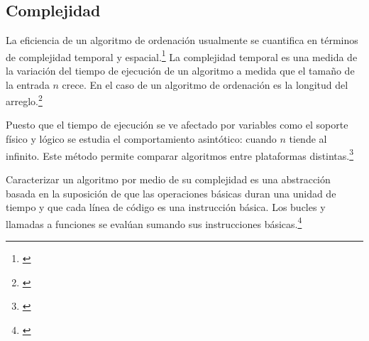 \documentclass[titlepage]{article}
\begin{document}
\subsection{Complejidad} %
La eficiencia de un algoritmo de ordenación usualmente se cuantifica en términos de complejidad temporal y espacial.\footnote{\cite{molluzzo1997first}} La complejidad temporal es una medida de la variación del tiempo de ejecución de un algoritmo a medida que el tamaño de la entrada $n$ crece. En el caso de un algoritmo de ordenación es la longitud del arreglo.\footnote{\cite{ching2023uncertainty}}

Puesto que el tiempo de ejecución se ve afectado por variables como el soporte físico y lógico se estudia el comportamiento asintótico: cuando $n$ tiende al infinito. Este método permite comparar algoritmos entre plataformas distintas.\footnote{\cite{Heineman2008-mw}}

Caracterizar un algoritmo por medio de su complejidad es una abstracción basada en la suposición de que las operaciones básicas duran una unidad de tiempo y que cada línea de código es una instrucción básica. Los bucles y llamadas a funciones se evalúan sumando sus instrucciones básicas.\footnote{\cite{datacamp2024bigO}}
\end{document}
